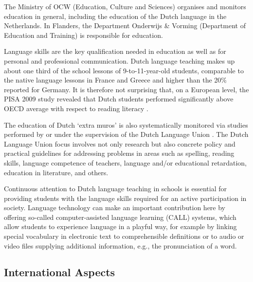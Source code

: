 \begin{multicols}{2}
The Ministry of OCW (Education, Culture and Sciences) organises and monitors education in general, including the education of the Dutch language in the Netherlands. In Flanders, the Department Onderwijs \& Vorming (Department of Education and Training) is responsible for education.

Language skills are the key qualification needed in education as well as for personal and professional communication. Dutch language teaching makes up about one third of the school lessons of 9-to-11-year-old students, comparable to the native language lessons in France and Greece and higher than the 20\% reported for Germany.  It is therefore not surprising that, on a European level, the PISA 2009 study revealed that Dutch students performed significantly above OECD average with respect to reading literacy \cite{Dataoecd}.

The education of Dutch `extra muros' is also systematically monitored via studies performed by or under the supervision of the Dutch Language Union \cite{NTUOnderwijs}.  The Dutch Language Union focus involves not only research but also concrete policy and practical guidelines for addressing problems in areas such as spelling, reading skills, language competence of teachers, language and/or educational retardation, education in literature, and others.



Continuous attention to Dutch language teaching in schools is essential for providing students with the language skills required for an active participation in society. Language technology can make an important contribution here by offering so-called computer-assisted language learning (CALL) systems, which allow students to experience language in a playful way, for example by linking special vocabulary in electronic text to comprehensible definitions or to audio or video files supplying additional information, e.g., the pronunciation of a word.

\subsection{International Aspects}


\end{multicols}
